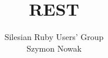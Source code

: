 \documentclass[16pt]{beamer}
\author{Silesian Ruby Users' Group\\
  \footnotesize{Szymon Nowak}}
\title{REST}
\begin{document}
\frame{\titlepage}



\end{document}
